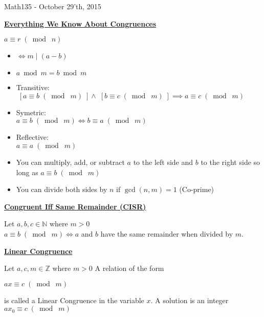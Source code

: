\documentclass{letter}
\begin{document}
	\begin{center}
		\LARGE Math135 - October 29'th, 2015
	\end{center}
	\vspace{0.25 in}
	\underline{\textbf{Everything We Know About Congruences}}
	\vspace{0.25 in}
	
	$a \equiv r \;(\bmod\; n)$
	\begin{itemize}
		\item $\iff m \mid (a-b)$
		\item $a \bmod m = b \bmod m$
		\item Transitive:\\
		$\;[a \equiv b \;(\bmod\; m)\;]
		\land 
		\;[b \equiv c \;(\bmod\; m)\;]
		\implies
		a \equiv c \;(\bmod\; m) $
		\item Symetric: \\
		$a \equiv b\;(\bmod\; m) 
		\iff
		b \equiv a\;(\bmod\; m)$
		\item Reflective:\\
		$a \equiv a\;(\bmod\; m)$
		\item You can multiply, add, or subtract $a$ to the left side and $b$ to the right side so long as 
		$a \equiv b\;(\bmod\; m)$
		\item You can divide both sides by $n$ if $\gcd(n, m) = 1$ (Co-prime)
	\end{itemize}
	
	\vspace{0.25 in}
	
	\underline{\textbf{Congruent Iff Same Remainder (CISR)}}
	\vspace{0.25 in}

	Let $a, b, c \in \mathbb{N}$ where $m>0$\\
	$a \equiv b\;(\bmod\; m) \iff a$ and $b$ have the same remainder when divided by $m$.
	
	\vspace{0.25 in}
		
	\underline{\textbf{Linear Congruence}}
	\vspace{0.25 in}
	
	Let $a, c, m \in \mathbb{Z}$ where $m>0$
	A relation of the form 

	\begin{center}
	$ax \equiv c\;(\bmod\; m)$
	\end{center}
	
	
	is called a Linear Congruence in the variable $x$. A solution is an integer $ax_0 \equiv c\;(\bmod\; m)$
	
\end{document}
